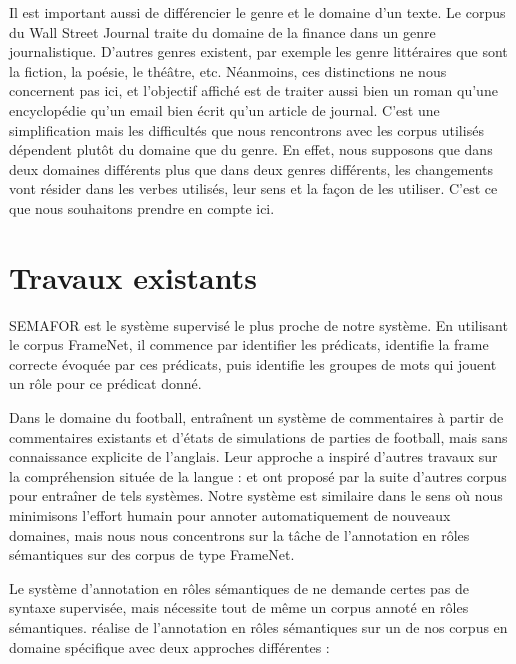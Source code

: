 
Il est important aussi de différencier le genre et le domaine d'un texte. Le
corpus du Wall Street Journal traite du domaine de la finance dans un genre
journalistique. D'autres genres existent, par exemple les genre littéraires que
sont la fiction, la poésie, le théâtre, etc. Néanmoins, ces distinctions ne
nous concernent pas ici, et l'objectif affiché est de traiter aussi bien un
roman qu'une encyclopédie qu'un email bien écrit qu'un article de journal.
C'est une simplification mais les difficultés que nous rencontrons avec les
corpus utilisés dépendent plutôt du domaine que du genre. En effet, nous
supposons que dans deux domaines différents plus que dans deux genres
différents, les changements vont résider dans les verbes utilisés, leur sens et
la façon de les utiliser. C'est ce que nous souhaitons prendre en compte ici.

\section{Travaux existants}

SEMAFOR \citep{das2014frame} est le système supervisé le plus proche de notre
système. En utilisant le corpus FrameNet, il commence par identifier les
prédicats, identifie la frame correcte évoquée par ces prédicats, puis
identifie les groupes de mots qui jouent un rôle pour ce prédicat donné.


Dans le domaine du football, \cite{chen2008learning} entraînent un système de
commentaires à partir de commentaires existants et d'états de simulations de
parties de football, mais sans connaissance explicite de l'anglais. Leur
approche a inspiré d'autres travaux sur la compréhension située de la langue :
\citep{bordes2010towards} et \cite{richardson2012towards} ont proposé par la
suite d'autres corpus pour entraîner de tels systèmes. Notre système est
similaire dans le sens où nous minimisons l'effort humain pour annoter
automatiquement de nouveaux domaines, mais nous nous concentrons sur la tâche
de l'annotation en rôles sémantiques sur des corpus de type FrameNet.

Le système d'annotation en rôles sémantiques de \cite{gormley2014low} ne
demande certes pas de syntaxe supervisée, mais nécessite tout de même un corpus
annoté en rôles sémantiques. \cite{hadouche2011annotation} réalise de
l'annotation en rôles sémantiques sur un de nos corpus en domaine spécifique
avec deux approches différentes :

